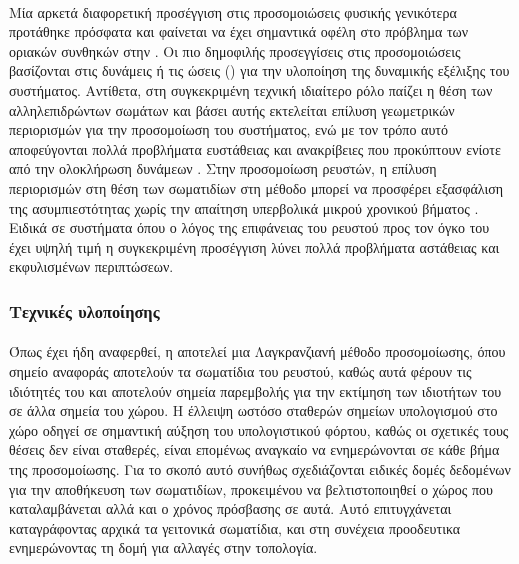 \paragraph{} Μία αρκετά διαφορετική προσέγγιση στις προσομοιώσεις φυσικής γενικότερα
προτάθηκε πρόσφατα και φαίνεται να έχει σημαντικά οφέλη στο πρόβλημα των οριακών συνθηκών
στην . Οι πιο δημοφιλής προσεγγίσεις στις προσομοιώσεις βασίζονται στις δυνάμεις
ή τις ώσεις () για την υλοποίηση της δυναμικής εξέλιξης του
συστήματος. Αντίθετα, στη συγκεκριμένη τεχνική ιδιαίτερο ρόλο παίζει η θέση των
αλληλεπιδρώντων σωμάτων και βάσει αυτής εκτελείται επίλυση γεωμετρικών περιορισμών για την
προσομοίωση του συστήματος, ενώ με τον τρόπο αυτό αποφεύγονται πολλά προβλήματα ευστάθειας
και ανακρίβειες που προκύπτουν ενίοτε από την ολοκλήρωση δυνάμεων
\cite{Muller2007109}. Στην προσομοίωση ρευστών, η επίλυση περιορισμών στη θέση των
σωματιδίων στη μέθοδο  μπορεί να προσφέρει εξασφάλιση της ασυμπιεστότητας χωρίς
την απαίτηση υπερβολικά μικρού χρονικού βήματος \cite{macklin2013position}. Ειδικά σε
συστήματα όπου ο λόγος της επιφάνειας του ρευστού προς τον όγκο του έχει υψηλή τιμή η
συγκεκριμένη προσέγγιση λύνει πολλά προβλήματα αστάθειας και εκφυλισμένων περιπτώσεων.

\subsubsection{Τεχνικές υλοποίησης}
\label{sssec:implementation-techniques}
\paragraph{} Όπως έχει ήδη αναφερθεί, η  αποτελεί μια Λαγκρανζιανή μέθοδο
προσομοίωσης, όπου σημείο αναφοράς αποτελούν τα σωματίδια του ρευστού, καθώς αυτά φέρουν
τις ιδιότητές του και αποτελούν σημεία παρεμβολής για την εκτίμηση των ιδιοτήτων του σε
άλλα σημεία του χώρου. Η έλλειψη ωστόσο σταθερών σημείων υπολογισμού στο χώρο οδηγεί σε
σημαντική αύξηση του υπολογιστικού φόρτου, καθώς οι σχετικές τους θέσεις δεν είναι
σταθερές, είναι επομένως αναγκαίο να ενημερώνονται σε κάθε βήμα της προσομοίωσης. Για το
σκοπό αυτό συνήθως σχεδιάζονται ειδικές δομές δεδομένων για την αποθήκευση των σωματιδίων,
προκειμένου να βελτιστοποιηθεί ο χώρος που καταλαμβάνεται αλλά και ο χρόνος πρόσβασης σε
αυτά. Αυτό επιτυγχάνεται καταγράφοντας αρχικά τα γειτονικά σωματίδια, και στη συνέχεια
προοδευτικα ενημερώνοντας τη δομή για αλλαγές στην τοπολογία.

